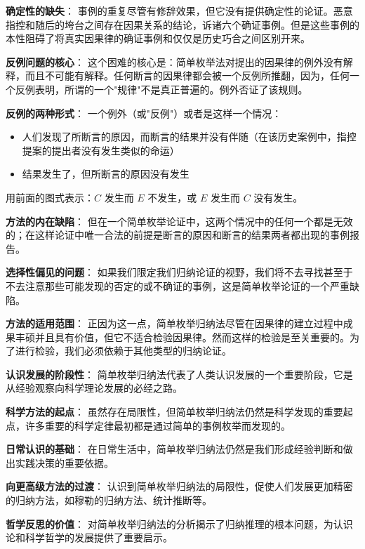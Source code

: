 \begin{theorembox}[title=简单枚举归纳法的根本局限性]
\textbf{确定性的缺失}：
事例的重复尽管有修辞效果，但它没有提供确定性的论证。恶意指控和随后的垮台之间存在因果关系的结论，诉诸六个确证事例。但是这些事例的本性阻碍了将真实因果律的确证事例和仅仅是历史巧合之间区别开来。

\textbf{反例问题的核心}：
这个困难的核心是：简单枚举法对提出的因果律的例外没有解释，而且不可能有解释。任何断言的因果律都会被一个反例所推翻，因为，任何一个反例表明，所谓的一个"规律"不是真正普遍的。例外否证了该规则。

\textbf{反例的两种形式}：
一个例外（或"反例"）或者是这样一个情况：
\begin{itemize}
\item 人们发现了所断言的原因，而断言的结果并没有伴随（在该历史案例中，指控提案的提出者没有发生类似的命运）
\item 结果发生了，但所断言的原因没有发生
\end{itemize}

用前面的图式表示：$C$ 发生而 $E$ 不发生，或 $E$ 发生而 $C$ 没有发生。

\textbf{方法的内在缺陷}：
但在一个简单枚举论证中，这两个情况中的任何一个都是无效的；在这样论证中唯一合法的前提是断言的原因和断言的结果两者都出现的事例报告。

\textbf{选择性偏见的问题}：
如果我们限定我们归纳论证的视野，我们将不去寻找甚至于不去注意那些可能发现的否定的或不确证的事例，这是简单枚举论证的一个严重缺陷。

\textbf{方法的适用范围}：
正因为这一点，简单枚举归纳法尽管在因果律的建立过程中成果丰硕并且具有价值，但它不适合检验因果律。然而这样的检验是至关重要的。为了进行检验，我们必须依赖于其他类型的归纳论证。
\end{theorembox}

\begin{theorembox}[title=简单枚举归纳法的认识论意义与历史地位]
\textbf{认识发展的阶段性}：
简单枚举归纳法代表了人类认识发展的一个重要阶段，它是从经验观察向科学理论发展的必经之路。

\textbf{科学方法的起点}：
虽然存在局限性，但简单枚举归纳法仍然是科学发现的重要起点，许多重要的科学定律最初都是通过简单的事例枚举而发现的。

\textbf{日常认识的基础}：
在日常生活中，简单枚举归纳法仍然是我们形成经验判断和做出实践决策的重要依据。

\textbf{向更高级方法的过渡}：
认识到简单枚举归纳法的局限性，促使人们发展更加精密的归纳方法，如穆勒的归纳方法、统计推断等。

\textbf{哲学反思的价值}：
对简单枚举归纳法的分析揭示了归纳推理的根本问题，为认识论和科学哲学的发展提供了重要启示。
\end{theorembox}

